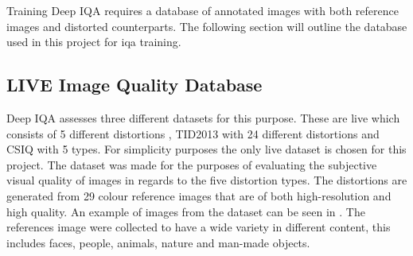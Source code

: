 Training Deep IQA requires a database of annotated images with both reference images and distorted counterparts. The following section will outline the database used in this project for \gls{iqa} training.

\subsection{LIVE Image Quality Database}
Deep IQA assesses three different datasets for this purpose. These are \gls{live} which consists of 5 different distortions \cite{livepaper}, TID2013 \cite{tid2013} with 24 different distortions and CSIQ \cite{csiq} with 5 types. For simplicity purposes the only \gls{live} dataset is chosen for this project. The dataset was made for the purposes of evaluating the subjective visual quality of images in regards to the five distortion types. The distortions are generated from 29 colour reference images that are of both high-resolution and high quality. An example of images from the dataset can be seen in . The references image were collected to have a wide variety in different content, this includes faces, people, animals, nature and man-made objects.

